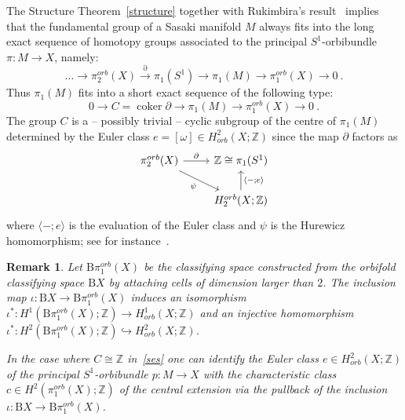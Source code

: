 \documentclass[12pt,leqno]{amsart}
\newcommand{\lra}{\longrightarrow}
\newcommand{\B}{\text{B}}
\newcommand{\Z}{\mathbb{Z}}
\newcommand{\coker}{{\operatorname{coker}}}
\newtheorem{remark}[theor]{Remark}
\begin{document}
The Structure Theorem~\ref{structure} together with Rukimbira's result~\cite{Ruk} implies that the fundamental group of a Sasaki manifold $M$ 
always fits into the long exact sequence of homotopy groups associated to the principal $S^1$-orbibundle $\pi\colon M\rightarrow X$, namely:
$$
\ldots\longrightarrow\pi_2^{orb}(X)\stackrel{\partial}{\longrightarrow}\pi_1(S^1)\longrightarrow\pi_1(M)\longrightarrow\pi_1^{orb}(X)\longrightarrow 0 \ .
$$
Thus $\pi_1(M)$ fits into a short exact sequence of the following type:
\begin{equation}\label{ses}
0\longrightarrow C=\coker \partial\longrightarrow\pi_1(M)\longrightarrow\pi_1^{orb}(X)\longrightarrow 0 \ .
\end{equation} 
The group $C$ is a -- possibly trivial -- cyclic subgroup of the centre of $\pi_1(M)$  determined by the Euler class $e=[\omega]\in H^2_{orb}(X;\Z)$ since the map $\partial$ 
factors as 
\begin{equation}\label{EqMapFact}
\begin{tikzcd}
\pi_2^{orb}(X) \arrow[r, "\partial"] \arrow[dr, "\psi"'] & \Z\cong\pi_1(S^1) \\
& H_2^{orb}(X;\Z ) \arrow[u, "\langle - ;e\rangle"'] 
\end{tikzcd}
\end{equation}
where $\langle - ;e\rangle$ is the evaluation of the Euler class and $\psi$ is the Hurewicz homomorphism; see for instance~\cite{Ham}.


\begin{remark}\label{euler}
	Let $\B\pi_1^{orb}(X)$ be the classifying space constructed from the orbifold classifying space  $\B X$ by attaching cells of 
	dimension larger than $2$. The inclusion map $\iota\colon\B X\lra \B\pi_1^{orb}(X)$ induces an isomorphism 
	$\iota^*\colon H^1(\B \pi_1^{orb}(X);\Z)\lra H^1_{orb}(X;\Z)$  and an injective homomorphism
	$\iota^*\colon H^2(\B \pi_1^{orb}(X);\Z)\hookrightarrow H^2_{orb}(X;\Z)$.
	
	
	In the case where $C\cong \Z$ in~\eqref{ses} one can identify the Euler class $e\in H^2_{orb}(X;\Z)$ of the principal $S^1$-orbibundle 
	$p\colon M\longrightarrow X$ with the characteristic class $c\in H^2(\pi_1^{orb}(X);\Z)$ of the central extension via the pullback of the inclusion $\iota\colon\B X\longrightarrow \B\pi_1^{orb}(X)$. 
\end{remark}
\end{document}
